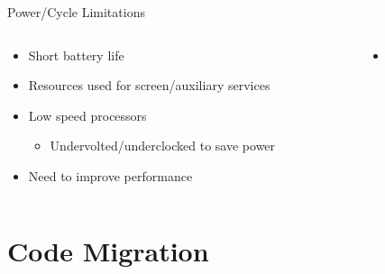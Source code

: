 \documentclass{beamer}
\begin{document}
\begin{frame}{Power/Cycle Limitations}
\begin{columns}
\begin{column}{5cm}
\begin{itemize}
	\item Short battery life
	\item Resources used for screen/auxiliary services
	\item Low speed processors
	\begin{itemize}
		\item Undervolted/underclocked to save power
	\end{itemize}
	\item Need to improve performance
\end{itemize}
\end{column}
\begin{column}{5cm}
\begin{itemize}
	\begin{itemize}
		\item {}
	\end{itemize}
\end{itemize}
\end{column}
\end{columns}
\end{frame}

\section{Code Migration}
\end{document}
